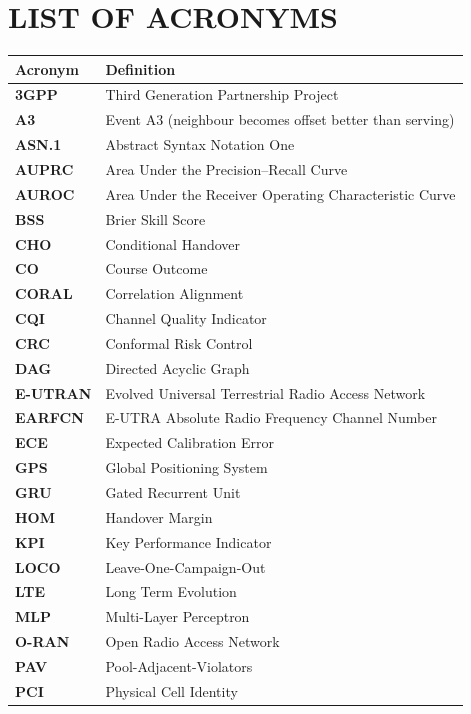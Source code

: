 \chapter*{LIST OF ACRONYMS}

\singlespacing
\begin{longtable}{p{3.0cm} p{11.5cm}}
\toprule
\textbf{Acronym} & \textbf{Definition} \\
\midrule
\endhead
\textbf{3GPP} & Third Generation Partnership Project \\
\textbf{A3} & Event A3 (neighbour becomes offset better than serving) \\
\textbf{ASN.1} & Abstract Syntax Notation One \\
\textbf{AUPRC} & Area Under the Precision--Recall Curve \\
\textbf{AUROC} & Area Under the Receiver Operating Characteristic Curve \\
\textbf{BSS} & Brier Skill Score \\
\textbf{CHO} & Conditional Handover \\
\textbf{CO} & Course Outcome \\
\textbf{CORAL} & Correlation Alignment \\
\textbf{CQI} & Channel Quality Indicator \\
\textbf{CRC} & Conformal Risk Control \\
\textbf{DAG} & Directed Acyclic Graph \\
\textbf{E-UTRAN} & Evolved Universal Terrestrial Radio Access Network \\
\textbf{EARFCN} & E-UTRA Absolute Radio Frequency Channel Number \\
\textbf{ECE} & Expected Calibration Error \\
\textbf{GPS} & Global Positioning System \\
\textbf{GRU} & Gated Recurrent Unit \\
\textbf{HOM} & Handover Margin \\
\textbf{KPI} & Key Performance Indicator \\
\textbf{LOCO} & Leave-One-Campaign-Out \\
\textbf{LTE} & Long Term Evolution \\
\textbf{MLP} & Multi-Layer Perceptron \\
\textbf{O-RAN} & Open Radio Access Network \\
\textbf{PAV} & Pool-Adjacent-Violators \\
\textbf{PCI} & Physical Cell Identity \\

\end{longtable}
